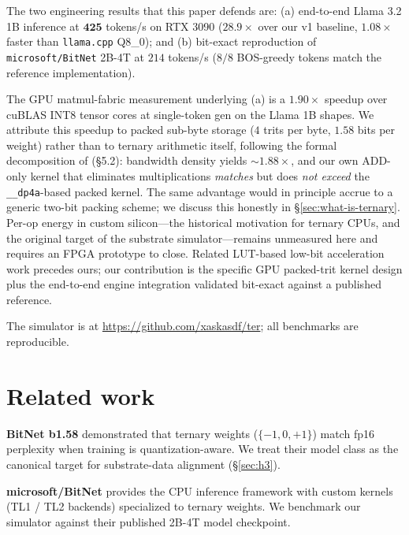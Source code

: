 \documentclass{article}
\begin{document}
The two engineering results that this paper defends are:
(a) end-to-end Llama 3.2 1B inference at $\mathbf{425}$ tokens/s on
{RTX 3090} ($28.9\times$ over our v1 baseline, $1.08\times$ faster
than \texttt{llama.cpp} \citep{llamacpp} {Q8\_0}); and
(b) bit-exact reproduction of \texttt{microsoft/BitNet} 2B-4T at
$214$ tokens/s ($8/8$ BOS-greedy tokens match the reference
implementation).

The {GPU} matmul-fabric measurement underlying (a) is a $1.90\times$
speedup over cuBLAS {INT8} tensor cores at single-token gen on the
Llama 1B shapes. We attribute this speedup to packed sub-byte storage
($4$ trits per byte, $1.58$ bits per weight) rather than to ternary
arithmetic itself, following the formal decomposition of
\citet{cuevas-formal-2026} (\S5.2): bandwidth density yields $\sim 1.88\times$,
and our own {ADD}-only kernel that eliminates multiplications
\emph{matches} but does \emph{not exceed} the \texttt{\_\_dp4a}-based
packed kernel. The same advantage would in principle accrue to a
generic two-bit packing scheme; we discuss this honestly in
\S\ref{sec:what-is-ternary}. Per-op energy in custom silicon---the
historical motivation for ternary {CPU}s, and the original target of
the substrate simulator---remains unmeasured here and requires an
{FPGA} prototype to close. Related {LUT}-based low-bit acceleration
work \citep{tmac-eurosys-2025,lutmul-aspdac-2025,platinum-2025,tellme-2025,cutie-2020}
precedes ours; our contribution is the specific {GPU} packed-trit
kernel design plus the end-to-end engine integration validated
bit-exact against a published reference.

The simulator is at \url{https://github.com/xaskasdf/ter}; all
benchmarks are reproducible.

\section{Related work}

\textbf{BitNet b1.58} \citep{bitnet158-2024} demonstrated that ternary
weights ($\{-1, 0, +1\}$) match fp16 perplexity when training is
quantization-aware. We treat their model class as the canonical
target for substrate-data alignment ({\S}\ref{sec:h3}).

\textbf{microsoft/BitNet} \citep{microsoft-bitnet-cpp} provides the
{CPU} inference framework with custom kernels (TL1 / TL2 backends)
specialized to ternary weights. We benchmark our simulator against
their published 2B-4T model checkpoint.
\end{document}
